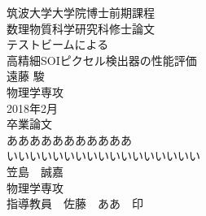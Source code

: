 \thispagestyle{empty}
\begin{center}
\LARGE
筑波大学大学院博士前期課程 \\
\vspace{1.5 cm}
数理物質科学研究科修士論文 \\
\LARGE
\vspace{4 cm}
テストビームによる\\
高精細SOIピクセル検出器の性能評価\\
\vspace{8 cm}
\LARGE
遠藤 駿 \\
物理学専攻
\\
\vspace{1.5 cm}
2018年2月\\
\rm
\newpage
\thispagestyle{empty}
\mbox{}\newpage
\newpage
\thispagestyle{empty}
\LARGE
卒業論文 \\
\LARGE
\vspace{4 cm}
あああああああああああ\\
いいいいいいいいいいいいいいいいい\\
\vspace{8 cm}
\LARGE
笠島　誠嘉 \\
物理学専攻
\\
\vspace{1.5 cm}
指導教員　佐藤　ああ　印\\
\end{center}
\rm

\newpage
\thispagestyle{empty}
\mbox{}\newpage

